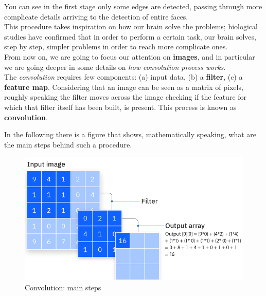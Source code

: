 \noindent
You can see in the first stage only some edges are detected, passing through more complicate details arriving to the detection of entire faces. \\
This procedure takes inspiration on how our brain solve the problems; biological studies have confirmed that in order to perform a certain task, our brain solves, step by step, simpler problems in order to reach more complicate ones.\\
From now on, we are going to focus our attention on \textbf{images}, and in particular we are going deeper in some details on \textit{how convolution process works}.\\

The \textit{convolution} requires few components: (a) input data, (b) a \textbf{filter}, (c) a \textbf{feature map}. Considering that an image can be seen as a matrix of pixels, roughly speaking the filter moves across the image checking if the feature for which that filter itself has been built, is present. This process is known as \textbf{convolution}.

In the following there is a figure that shows, mathematically speaking, what are the main steps behind such a procedure.

\begin{figure}[h]
    \centering
    \includegraphics[scale=0.8]{img/convolution.png}
    \caption{Convolution: main steps}
\end{figure}


